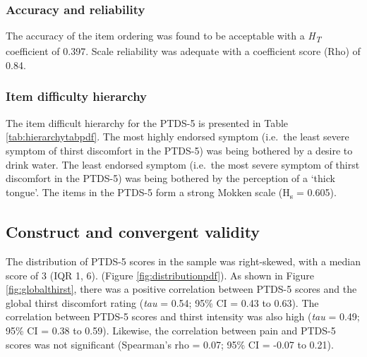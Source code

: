\documentclass[12pt,twocolumn,twoside,]{pinp}
\begin{document}
\hypertarget{accuracy-and-reliability}{%
\subsubsection{Accuracy and
reliability}\label{accuracy-and-reliability}}

The accuracy of the item ordering was found to be acceptable with a
\emph{H\textsubscript{T}} coefficient of 0.397. Scale reliability was
adequate with a coefficient score (Rho) of 0.84.

\hypertarget{item-difficulty-hierarchy}{%
\subsubsection{Item difficulty
hierarchy}\label{item-difficulty-hierarchy}}

The item difficult hierarchy for the PTDS-5 is presented in Table
\ref{tab:hierarchytabpdf}. The most highly endorsed symptom (i.e.~the
least severe symptom of thirst discomfort in the PTDS-5) was being
bothered by a desire to drink water. The least endorsed symptom
(i.e.~the most severe symptom of thirst discomfort in the PTDS-5) was
being bothered by the perception of a `thick tongue'. The items in the
PTDS-5 form a strong Mokken scale (H\textsubscript{s} = 0.605).

\hypertarget{construct-and-convergent-validity}{%
\subsection{Construct and convergent
validity}\label{construct-and-convergent-validity}}

The distribution of PTDS-5 scores in the sample was right-skewed, with a
median score of 3 (IQR 1, 6). (Figure \ref{fig:distributionpdf}). As
shown in Figure \ref{fig:globalthirst}, there was a positive correlation
between PTDS-5 scores and the global thirst discomfort rating
(\emph{tau} = 0.54; 95\% CI = 0.43 to 0.63). The correlation between
PTDS-5 scores and thirst intensity was also high (\emph{tau} = 0.49;
95\% CI = 0.38 to 0.59). Likewise, the correlation between pain and
PTDS-5 scores was not significant (Spearman's rho = 0.07; 95\% CI =
-0.07 to 0.21).
\end{document}
